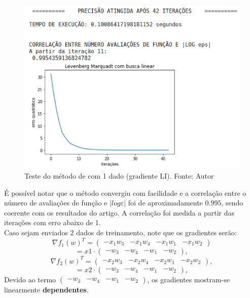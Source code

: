 \documentclass[11pt]{article}
\begin{document}
\begin{figure}[H]
\center
\includegraphics[scale=0.7]{Figuras/lmbl1.png}
\caption{Teste do método de \cite{bmLS} com 1 dado (gradiente LI). Fonte: Autor} 
\label{lmbl1}
\end{figure}

É possível notar que o método convergiu com facilidade e a correlação entre o número de avaliações de função e $|log \varepsilon|$ foi de aproximadamente $0.995$, sendo coerente com os resultados do artigo. A correlação foi medida a partir das iterações com erro abaixo de 1.\\

Caso sejam enviados 2 dados de treinamento, note que os gradientes serão:
$$\nabla f_1(w)^T = \begin{pmatrix}-x_1 w_3 & -x_1 w_4 & -x_1 w_1 & -x_1 w_2  \end{pmatrix}$$
$$ = x1 \cdot \begin{pmatrix}-w_3 & -w_4 & -w_1 & - w_2  \end{pmatrix},$$
$$\nabla f_2(w)^T = \begin{pmatrix}-x_2 w_3 & -x_2 w_4 & -x_2 w_1 & -x_2 w_2  \end{pmatrix},$$
$$ = x2 \cdot \begin{pmatrix}-w_3 & -w_4 & -w_1 & - w_2  \end{pmatrix},$$
Devido ao termo $\begin{pmatrix}-w_3 & -w_4 & -w_1 & - w_2  \end{pmatrix}$, os gradientes mostram-se linearmente \textbf{dependentes}.
\end{document}

